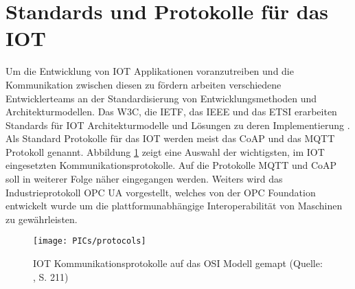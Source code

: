 \documentclass[BMR,Bachelor,ngerman]{twbook}%
\begin{document}
\section{Standards und Protokolle für das \ac{IOT}}
Um die Entwicklung von \ac{IOT} Applikationen voranzutreiben und die Kommunikation zwischen diesen zu fördern arbeiten verschiedene Entwicklerteams an der Standardisierung von Entwicklungsmethoden und Architekturmodellen. Das \ac{W3C}, die \ac{IETF}, das \ac{IEEE} und das \ac{ETSI} erarbeiten Standards für \ac{IOT} Architekturmodelle und Lösungen zu deren Implementierung \cite{alfuqaha2015survey}. Als Standard Protokolle für das \ac{IOT} werden meist das \acf{CoAP} und das \acf{MQTT} Protokoll genannt. Abbildung \ref{fig:protocols} zeigt eine Auswahl der wichtigsten, im \ac{IOT} eingesetzten Kommunikationsprotokolle. Auf die Protokolle \ac{MQTT} und \ac{CoAP} soll in weiterer Folge näher eingegangen werden. Weiters wird das Industrieprotokoll \ac{OPC UA} vorgestellt, welches von der OPC Foundation entwickelt wurde um die plattformunabhängige Interoperabilität von Maschinen zu gewährleisten.
\begin{figure}[!htbp]
\centering
\texttt{[image: PICs/protocols]}
\caption{\ac{IOT} Kommunikationsprotokolle auf das \ac{OSI} Modell gemapt (Quelle: \protect\cite{nathali2018iot}, S. 211)}\label{fig:protocols}
\end{figure}
%
\end{document}
